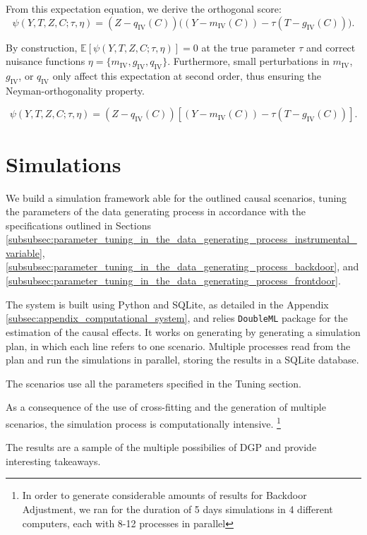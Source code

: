 \documentclass{article}
\numberwithin{equation}{section}
\begin{document}
From this expectation equation, we derive the orthogonal score:
\[
\psi(Y, T, Z, C; \tau, \eta) 
= (Z - q_{\text{IV}}(C))\bigl((Y - m_{\text{IV}}(C)) - \tau (T - g_{\text{IV}}(C))\bigr).
\]

By construction, \(\mathbb{E}[\psi(Y, T, Z, C; \tau, \eta)] = 0\) at the true parameter \(\tau\) and correct nuisance functions \(\eta = \{m_{\text{IV}}, g_{\text{IV}}, q_{\text{IV}}\}\). Furthermore, small perturbations in \(m_{\text{IV}}\), \(g_{\text{IV}}\), or \(q_{\text{IV}}\) only affect this expectation at second order, thus ensuring the Neyman-orthogonality property.

\begin{equation}
\psi(Y, T, Z, C; \tau, \eta) 
= (Z - q_{\text{IV}}(C)) \left[ (Y - m_{\text{IV}}(C)) - \tau (T - g_{\text{IV}}(C)) \right].
\end{equation}

\section{Simulations}

We build a simulation framework able for the outlined causal scenarios, tuning the parameters of the data generating process in accordance with the specifications outlined in Sections \ref{subsubsec:parameter_tuning_in_the_data_generating_process_instrumental_variable}, \ref{subsubsec:parameter_tuning_in_the_data_generating_process_backdoor}, and \ref{subsubsec:parameter_tuning_in_the_data_generating_process_frontdoor}.

The system is built using Python and SQLite, as detailed in the Appendix \ref{subsec:appendix_computational_system}, and relies \texttt{DoubleML} package for the estimation of the causal effects. It works on generating by generating a simulation plan, in which each line refers to one scenario. Multiple processes read from the plan and run the simulations in parallel, storing the results in a SQLite database.

The scenarios use all the parameters specified in the Tuning section.

As a consequence of the use of cross-fitting and the generation of multiple scenarios, the simulation process is computationally intensive. \footnote{In order to generate considerable amounts of results for Backdoor Adjustment, we ran for the duration of 5 days simulations in 4 different computers, each with 8-12 processes in parallel}

The results are a sample of the multiple possibilies of DGP and provide interesting takeaways.
\end{document}
